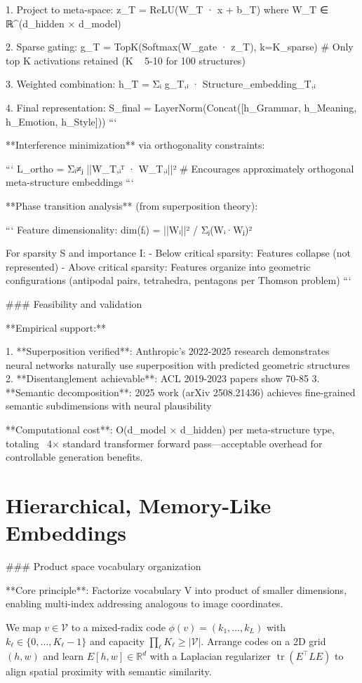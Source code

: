 \documentclass[11pt]{article}
\begin{document}
1. Project to meta-space:
   z_T = ReLU(W_T · x + b_T)  where W_T ∈ ℝ^(d_hidden × d_model)

2. Sparse gating:
   g_T = TopK(Softmax(W_gate · z_T), k=K_sparse)
   # Only top K activations retained (K ~ 5-10 for 100 structures)

3. Weighted combination:
   h_T = Σᵢ g_T,ᵢ · Structure_embedding_T,ᵢ

4. Final representation:
   S_final = LayerNorm(Concat([h_Grammar, h_Meaning, h_Emotion, h_Style]))
```

**Interference minimization** via orthogonality constraints:

```
L_ortho = Σᵢ≠ⱼ ||W_T,ᵢᵀ · W_T,ᵢ||² 
# Encourages approximately orthogonal meta-structure embeddings
```

**Phase transition analysis** (from superposition theory):

```
Feature dimensionality: dim(fᵢ) = ||Wᵢ||² / Σⱼ(Wᵢ·Wⱼ)²

For sparsity S and importance I:
- Below critical sparsity: Features collapse (not represented)
- Above critical sparsity: Features organize into geometric configurations
  (antipodal pairs, tetrahedra, pentagons per Thomson problem)
```

### Feasibility and validation

**Empirical support:**

1. **Superposition verified**: Anthropic's 2022-2025 research demonstrates neural networks naturally use superposition with predicted geometric structures
2. **Disentanglement achievable**: ACL 2019-2023 papers show 70-85%
3. **Semantic decomposition**: 2025 work (arXiv 2508.21436) achieves fine-grained semantic subdimensions with neural plausibility

**Computational cost**: O(d_model × d_hidden) per meta-structure type, totaling ~4× standard transformer forward pass—acceptable overhead for controllable generation benefits.

\section{Hierarchical, Memory-Like Embeddings}

### Product space vocabulary organization

**Core principle**: Factorize vocabulary V into product of smaller dimensions, enabling multi-index addressing analogous to image coordinates.

We map $v\in\mathcal{V}$ to a mixed-radix code $\phi(v){=}(k_1,\ldots,k_L)$ with $k_\ell\in\{0,\ldots,K_\ell{-}1\}$ and capacity $\prod_\ell K_\ell\ge |\mathcal{V}|$. Arrange codes on a 2D grid $(h,w)$ and learn $E[h,w]\in\mathbb{R}^d$ with a Laplacian regularizer $\operatorname{tr}(E^\top L E)$ to align spatial proximity with semantic similarity.
\end{document}
